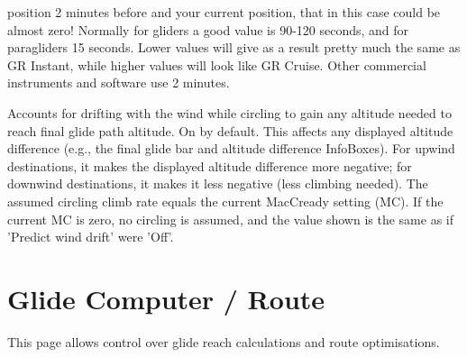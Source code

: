 \begin{description}
  position 2 minutes before and your current position, that in this case could be 
  almost zero! Normally for gliders a good value is 90-120 seconds, and for paragliders 
  15 seconds. Lower values will give as a result pretty much the same as GR Instant, 
  while higher values will look like GR Cruise. Other commercial instruments and 
  software use 2 minutes.
\item[Predict wind drift*]  \label{conf:predict-drift} Accounts for drifting with
  the wind while circling to gain any altitude needed to reach final glide path
  altitude. On by default. This affects any displayed altitude difference (e.g.,
  the final glide bar and altitude difference InfoBoxes). For upwind destinations,
  it makes the displayed altitude difference more negative; for downwind
  destinations, it makes it less negative (less climbing needed). The assumed
  circling climb rate equals the current MacCready setting (MC). If the current MC
  is zero, no circling is assumed, and the value shown is the same as if 'Predict
  wind drift' were 'Off'.
\end{description}


\section{Glide Computer / Route}\label{sec:glide-comp-route}

This page allows control over glide reach calculations and route
optimisations.

